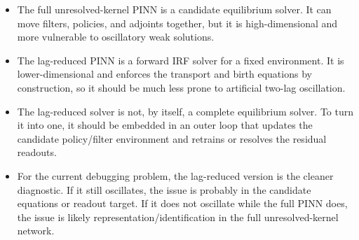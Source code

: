 \documentclass[11pt]{article}
\begin{document}
\begin{itemize}[leftmargin=*]
\item The full unresolved-kernel PINN is a candidate equilibrium solver.  It can
move filters, policies, and adjoints together, but it is high-dimensional and
more vulnerable to oscillatory weak solutions.
\item The lag-reduced PINN is a forward IRF solver for a fixed environment.  It
is lower-dimensional and enforces the transport and birth equations by
construction, so it should be much less prone to artificial two-lag
oscillation.
\item The lag-reduced solver is not, by itself, a complete equilibrium solver.
To turn it into one, it should be embedded in an outer loop that updates the
candidate policy/filter environment and retrains or resolves the residual
readouts.
\item For the current debugging problem, the lag-reduced version is the cleaner
diagnostic.  If it still oscillates, the issue is probably in the candidate
equations or readout target.  If it does not oscillate while the full PINN does,
the issue is likely representation/identification in the full unresolved-kernel
network.
\end{itemize}
\end{document}

